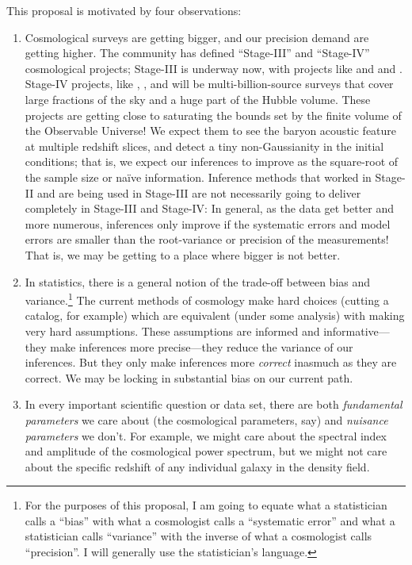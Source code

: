 \documentclass[12pt]{article}
\begin{document}
This proposal is motivated by four observations:
\begin{enumerate}
\item
Cosmological surveys are getting bigger, and our precision demand are
getting higher.
The community has defined ``Stage-III'' and ``Stage-IV'' cosmological
projects; Stage-III is underway now, with projects like \boss and \des
and \panstarrs.
Stage-IV projects, like \lsst, \euclid, and \wfirst will be
multi-billion-source surveys that cover large fractions of the sky and
a huge part of the Hubble volume.
These projects are getting close to saturating the bounds set by the
finite volume of the Observable Universe!
We expect them to see the baryon acoustic feature at multiple redshift
slices, and detect a tiny non-Gaussianity in the initial conditions;
that is, we expect our inferences to improve as the square-root of the
sample size or na\"ive information.
Inference methods that worked in Stage-II and are being used in
Stage-III are not necessarily going to deliver completely in Stage-III
and Stage-IV:
In general, as the data get better and more numerous, inferences only
improve if the systematic errors and model errors are smaller than the
root-variance or precision of the measurements!
That is, we may be getting to a place where bigger is not better.
\item
In statistics, there is a general notion of the trade-off between bias
and variance.\footnote{For the purposes of this proposal, I am going to equate what a
statistician calls a ``bias'' with what a cosmologist calls a
``systematic error'' and what a statistician calls ``variance'' with
the inverse of what a cosmologist calls ``precision''.  I will
generally use the statistician's language.}
The current methods of cosmology make hard choices (cutting a catalog,
for example) which are equivalent (under some analysis) with making
very hard assumptions.
These assumptions are informed and informative---they make inferences
more precise---they reduce the variance of our inferences.
But they only make inferences more \emph{correct} inasmuch as they are
correct.
We may be locking in substantial bias on our current path.
\item
In every important scientific question or data set, there are both
\emph{fundamental parameters} we care about (the cosmological
parameters, say) and \emph{nuisance parameters} we don't.
For example, we might care about the spectral index and amplitude of
the cosmological power spectrum, but we might not care about the
specific redshift of any individual galaxy in the density field.

\end{enumerate}
\end{document}

